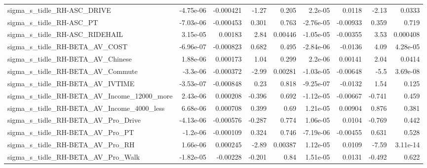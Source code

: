 \begin{tabular}{lrrrrrrrr}
sigma\_s\_tidle\_RH-ASC\_DRIVE                         &   -4.75e-06 &    -0.000421 &     -1.27 &    0.205 &    2.2e-05 &      0.0118 &        -2.13 &        0.0333 \\
sigma\_s\_tidle\_RH-ASC\_PT                            &   -7.03e-06 &    -0.000453 &     0.301 &    0.763 &  -2.76e-05 &    -0.00933 &        0.359 &         0.719 \\
sigma\_s\_tidle\_RH-ASC\_RIDEHAIL                      &    3.15e-05 &      0.00183 &      2.84 &  0.00446 &  -1.05e-05 &    -0.00355 &         3.53 &      0.000408 \\
sigma\_s\_tidle\_RH-BETA\_AV\_COST                      &   -6.96e-07 &    -0.000823 &     0.682 &    0.495 &  -2.84e-06 &     -0.0136 &         4.09 &      4.28e-05 \\
sigma\_s\_tidle\_RH-BETA\_AV\_Chinese                   &    1.88e-06 &     0.000173 &      1.04 &    0.299 &    2.2e-06 &     0.00141 &         2.04 &        0.0414 \\
sigma\_s\_tidle\_RH-BETA\_AV\_Commute                   &    -3.3e-06 &    -0.000372 &     -2.99 &  0.00281 &  -1.03e-05 &    -0.00648 &         -5.5 &      3.69e-08 \\
sigma\_s\_tidle\_RH-BETA\_AV\_IVTIME                    &   -3.53e-07 &    -0.000848 &      0.23 &    0.818 &  -9.25e-07 &     -0.0132 &         1.54 &         0.125 \\
sigma\_s\_tidle\_RH-BETA\_AV\_Income\_12000\_more         &    2.43e-06 &     0.000208 &    -0.396 &    0.692 &  -1.12e-05 &    -0.00667 &       -0.741 &         0.459 \\
sigma\_s\_tidle\_RH-BETA\_AV\_Income\_4000\_less          &    6.68e-06 &     0.000708 &     0.399 &     0.69 &   1.21e-05 &     0.00904 &        0.876 &         0.381 \\
sigma\_s\_tidle\_RH-BETA\_AV\_Pro\_Drive                 &   -4.13e-06 &    -0.000576 &    -0.287 &    0.774 &   1.06e-05 &      0.0104 &       -0.769 &         0.442 \\
sigma\_s\_tidle\_RH-BETA\_AV\_Pro\_PT                    &    -1.2e-06 &    -0.000109 &     0.324 &    0.746 &  -7.19e-06 &    -0.00455 &        0.631 &         0.528 \\
sigma\_s\_tidle\_RH-BETA\_AV\_Pro\_RH                    &    1.66e-06 &     0.000245 &     -2.89 &  0.00387 &   1.12e-05 &      0.0109 &        -7.59 &      3.11e-14 \\
sigma\_s\_tidle\_RH-BETA\_AV\_Pro\_Walk                  &   -1.82e-05 &     -0.00228 &    -0.201 &     0.84 &   1.51e-05 &      0.0131 &       -0.492 &         0.622 \\

\end{tabular}
